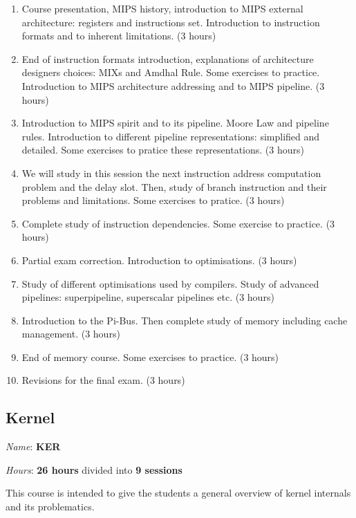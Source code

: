 \begin{multicols}{2}
\begin{enumerate}
  \item
    Course presentation, MIPS history, introduction to MIPS external
    architecture: registers and instructions set. Introduction to
    instruction formats and to inherent limitations. (3 hours)
  \item
    End of instruction formats introduction, explanations of architecture
    designers choices: MIXs and Amdhal Rule. Some exercises to practice.
    Introduction to MIPS architecture addressing and to MIPS pipeline.
    (3 hours)
  \item
    Introduction to MIPS spirit and to its pipeline. Moore Law and
    pipeline rules. Introduction to different pipeline representations:
    simplified and detailed. Some exercises to pratice these representations.
    (3 hours)
  \item
    We will study in this session the next instruction address computation
    problem and the delay slot. Then, study of branch instruction and their
    problems and limitations. Some exercises to pratice. (3 hours)
  \item
    Complete study of instruction dependencies. Some exercise to practice.
    (3 hours)
  \item
    Partial exam correction. Introduction to optimisations. (3 hours)
  \item
    Study of different optimisations used by compilers. Study of
    advanced pipelines: superpipeline, superscalar pipelines etc. (3 hours)
  \item
    Introduction to the Pi-Bus. Then complete study of memory including
    cache management. (3 hours)
  \item
    End of memory course. Some exercises to practice. (3 hours)
  \item
    Revisions for the final exam. (3 hours)
\end{enumerate}

%
%

\subsection{Kernel}

\textit{Name}: \textbf{KER}

\textit{Hours}: \textbf{26 hours} divided into \textbf{9 sessions}

This course is intended to give the students a general overview of
kernel internals and its problematics.


\end{multicols}
